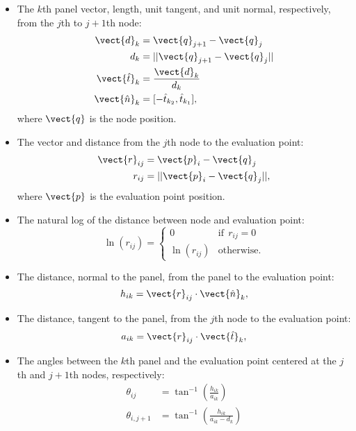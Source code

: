 \begin{itemize}
	\item The \(k\)th panel vector, length, unit tangent, and unit normal, respectively, from the \(j\)th to \(j+1\)th node:
	\begin{align}
		\vect{d}_k &= \vect{q}_{j+1} - \vect{q}_j \\
		d_k &= || \vect{q}_{j+1} - \vect{q}_j || \\
		\vect{\hat{t}}_k &= \frac{\vect{d}_k}{d_k} \\
		\vect{\hat{n}}_k &= [-\hat{t}_{k_2}, \hat{t}_{k_1}],
	\end{align}
	\noindent where \(\vect{q}\) is the node position.
	\item The vector and distance from the \(j\)th node to the evaluation point:
	\begin{align}
		\vect{r}_{ij} &= \vect{p}_i - \vect{q}_j \\
		r_{ij} &= ||\vect{p}_i - \vect{q}_j||,
	\end{align}
	\noindent where \(\vect{p}\) is the evaluation point position.
	\item The natural log of the distance between node and evaluation point:
	\begin{equation}
		\ln(r_{ij}) = \begin{cases}
			0 & \mathrm{if}~~ r_{ij} = 0 \\
			\ln(r_{ij}) & \mathrm{otherwise.}
		\end{cases}
	\end{equation}
	\item The distance, normal to the panel, from the panel to the evaluation point:
	\begin{equation}
		h_{ik} = \vect{r}_{ij}\cdot \vect{\hat{n}}_{k},
	\end{equation}
	\item The distance, tangent to the panel, from the \(j\)th node to the evaluation point:
	\begin{equation}
		a_{ik} = \vect{r}_{ij}\cdot \vect{\hat{t}}_{k},
	\end{equation}
	\item The angles between the \(k\)th panel and the evaluation point centered at the \(j\)th and \(j+1\)th nodes, respectively:
	\begin{align}
		\theta_{ij} &= \tan^{-1} \left( \frac{h_{ik}}{a_{ik}} \right) \\
		\theta_{i,j+1} &= \tan^{-1} \left( \frac{h_{ik}}{a_{ik} - d_k} \right) 
	\end{align}
\end{itemize}


